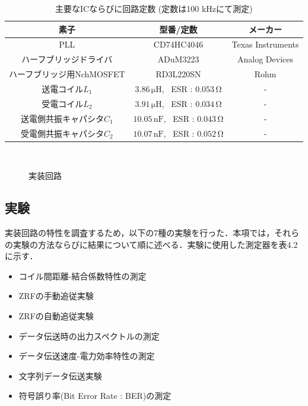 \begin{table}[h]
\centering
\caption{主要なICならびに回路定数 (定数は100 kHzにて測定)}
\begin{tabular}{c|c|c}
\hline
\multicolumn{1}{c|}{素子} & \multicolumn{1}{c|}{型番/定数} & \multicolumn{1}{c}{メーカー} \\ \hline
PLL & CD74HC4046 & Texas Instruments \\ \hline
ハーフブリッジドライバ & ADuM3223 & Analog Devices\\ \hline
ハーフブリッジ用NchMOSFET & RD3L220SN & Rohm \\ \hline
送電コイル$L_1$ & $3.86\, \mathrm{\mu H}$, \, ESR : $0.053\, \mathrm{\Omega}$ & - \\ \hline
受電コイル$L_2$ & $3.91\, \mathrm{\mu H}$, \, ESR : $0.034\, \mathrm{\Omega}$ & - \\ \hline
送電側共振キャパシタ$C_1$ & $10.05\, \mathrm{n F}$, \, ESR : $0.043\, \mathrm{\Omega}$ & - \\ \hline
受電側共振キャパシタ$C_2$ & $10.07\, \mathrm{n F}$, \, ESR : $0.052\, \mathrm{\Omega}$ & - \\ \hline
\end{tabular}
\end{table}

\begin{figure}[p]

	\begin{center}
    \\ \vspace{5mm}
	\end{center}
    
  \caption{実装回路}\label{circuitphoto}
\end{figure}

\subsection{実験}
実装回路の特性を調査するため，以下の7種の実験を行った．本項では，それらの実験の方法ならびに結果について順に述べる．実験に使用した測定器を表4.2に示す．

\begin{itemize} \setlength{\itemsep}{-0.2cm}
\item コイル間距離-結合係数特性の測定
\item ZRFの手動追従実験
\item ZRFの自動追従実験
\item データ伝送時の出力スペクトルの測定
\item データ伝送速度-電力効率特性の測定
\item 文字列データ伝送実験
\item 符号誤り率(Bit Error Rate : BER)の測定
\end{itemize}

